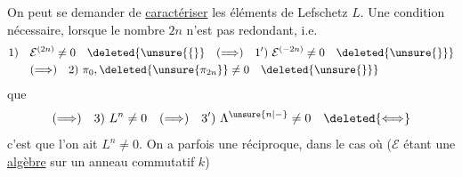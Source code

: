 On peut se demander de \uline{caractériser} les  éléments de Lefschetz $L$. Une condition nécessaire, lorsque le nombre $2n$ n'est pas redondant, i.e.
\[
\begin{aligned}
1)\quad&\mathcal E^{(2n)}\neq0\quad\deleted{\unsure{\{}}\quad(\Longrightarrow)\quad1')\ \mathcal E^{(-2n)}\neq0\quad\deleted{\unsure{\}}}\\
&(\Longrightarrow)\quad2)\ \pi_0,\deleted{\unsure{\pi_{2n}}}\neq0\quad\deleted{\unsure{\}}}
\end{aligned}
\]
que
\[
(\Longrightarrow)\quad3)\ L^n\neq0\quad(\Longrightarrow)\quad3')\ \Lambda^{\unsure{n|-}}\neq0\quad\deleted{\Longleftrightarrow}
\]
c'est que l'on ait $L^n\neq0$. On a parfois une réciproque, dans le cas où ($\mathcal E$ étant une \uline{algèbre} sur un anneau commutatif $k$)


